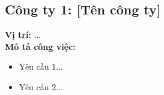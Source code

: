 \subsection{Công ty 1: [Tên công ty]}
\textbf{Vị trí:} ... \\
\textbf{Mô tả công việc:}
\begin{itemize}
    \item Yêu cầu 1...
    \item Yêu cầu 2...
\end{itemize}
